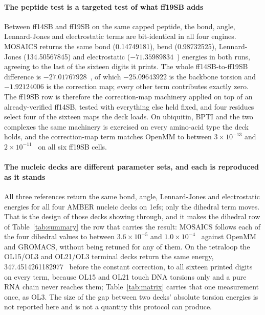\paragraph{The peptide test is a targeted test of what ff19SB adds}
Between ff14SB and ff19SB on the same capped peptide, the bond, angle,
Lennard-Jones and electrostatic terms are bit-identical in all four engines.
MOSAICS returns the same bond (0.14749181), bend (0.98732525), Lennard-Jones
(134.50567845) and electrostatic ($-71.35989834$~\kcal{}) energies in both
runs, agreeing to the last of the sixteen digits it prints. The whole ff14SB-to-ff19SB difference is
$-27.01767928$~\kcal{}, of which $-25.09643922$ is the backbone torsion and
$-1.92124006$ is the correction map; every other term contributes exactly zero.
The ff19SB row is therefore the correction-map machinery applied on top of an
already-verified ff14SB, tested with everything else held fixed, and four
residues select four of the sixteen maps the deck loads. On ubiquitin, BPTI and
the two complexes the same machinery is exercised on every amino-acid type the
deck holds, and the correction-map term matches OpenMM to between
$3\times10^{-13}$ and $2\times10^{-11}$~\kcal{} on all six ff19SB cells.

\paragraph{The nucleic decks are different parameter sets, and each is
reproduced as it stands}
All three references return the same bond, angle, Lennard-Jones and
electrostatic energies for all four AMBER nucleic decks on 1efs; only the
dihedral term moves. That is the design of those decks showing through, and it
makes the dihedral row of Table~\ref{tab:summary} the row that carries the
result: MOSAICS follows each of the four dihedral values to between
$3.6\times10^{-5}$ and $1.0\times10^{-4}$~\kcal{} against OpenMM and GROMACS,
without being retuned for any of them. On the tetraloop the OL15/OL3 and OL21/OL3
terminal decks return the same energy, 347.4514261182977~\kcal{} before the
constant correction, to all sixteen printed digits on every term, because OL15
and OL21 touch DNA torsions only and a pure RNA chain never reaches them;
Table~\ref{tab:matrix} carries that one measurement once, as OL3. The
size of the gap between two decks' absolute torsion energies is not reported
here and is not a quantity this protocol can produce.

